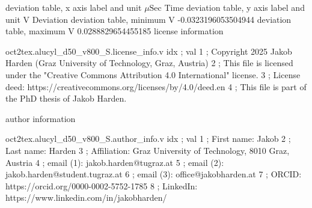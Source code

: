 \expandafter\def\csname oct2tex.alucyl_d50_v800_S.dtabxlbl.d\endcsname{deviation table, x axis label and unit}
\expandafter\def\csname oct2tex.alucyl_d50_v800_S.dtabxlbl.u\endcsname{\ensuremath{\mu\text{Sec}}}
\expandafter\def\csname oct2tex.alucyl_d50_v800_S.dtabxlbl.v\endcsname{Time}
\expandafter\def\csname oct2tex.alucyl_d50_v800_S.dtabylbl.d\endcsname{deviation table, y axis label and unit}
\expandafter\def\csname oct2tex.alucyl_d50_v800_S.dtabylbl.u\endcsname{\ensuremath{\text{V}}}
\expandafter\def\csname oct2tex.alucyl_d50_v800_S.dtabylbl.v\endcsname{Deviation}
\expandafter\def\csname oct2tex.alucyl_d50_v800_S.dtabmin.d\endcsname{deviation table, minimum}
\expandafter\def\csname oct2tex.alucyl_d50_v800_S.dtabmin.u\endcsname{\ensuremath{\text{V}}}
\expandafter\def\csname oct2tex.alucyl_d50_v800_S.dtabmin.v\endcsname{-0.0323196053504944}
\expandafter\def\csname oct2tex.alucyl_d50_v800_S.dtabmax.d\endcsname{deviation table, maximum}
\expandafter\def\csname oct2tex.alucyl_d50_v800_S.dtabmax.u\endcsname{\ensuremath{\text{V}}}
\expandafter\def\csname oct2tex.alucyl_d50_v800_S.dtabmax.v\endcsname{0.0288829654455185}
\expandafter\def\csname oct2tex.alucyl_d50_v800_S.license_info.d\endcsname{license information}
\begin{filecontents}[overwrite]{oct2tex.alucyl_d50_v800_S.license_info.v}
idx ; val
1 ; Copyright 2025 Jakob Harden (Graz University of Technology, Graz, Austria)
2 ; This file is licensed under the "Creative Commons Attribution 4.0 International" license.
3 ; License deed: https://creativecommons.org/licenses/by/4.0/deed.en
4 ; This file is part of the PhD thesis of Jakob Harden.
\end{filecontents}
\expandafter\def\csname oct2tex.alucyl_d50_v800_S.author_info.d\endcsname{author information}
\begin{filecontents}[overwrite]{oct2tex.alucyl_d50_v800_S.author_info.v}
idx ; val
1 ; First name: Jakob
2 ; Last name: Harden
3 ; Affiliation: Graz University of Technology, 8010 Graz, Austria
4 ; email (1): jakob.harden@tugraz.at
5 ; email (2): jakob.harden@student.tugraz.at
6 ; email (3): office@jakobharden.at
7 ; ORCID: https://orcid.org/0000-0002-5752-1785
8 ; LinkedIn: https://www.linkedin.com/in/jakobharden/
\end{filecontents}
